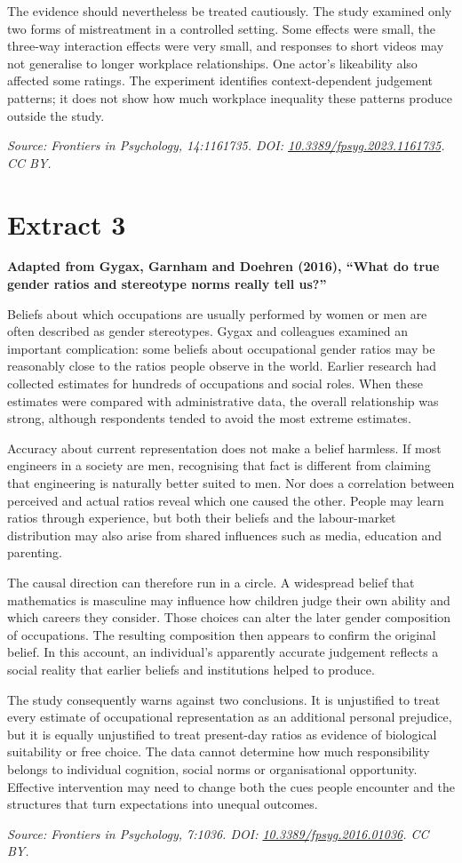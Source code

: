 \documentclass[11pt,a4paper]{article}
\newcommand{\sourceheading}[2]{%
  \section*{#1}
  \textbf{#2}\par\medskip
}
\begin{document}
The evidence should nevertheless be treated cautiously. The study examined only two forms of mistreatment in a controlled setting. Some effects were small, the three-way interaction effects were very small, and responses to short videos may not generalise to longer workplace relationships. One actor's likeability also affected some ratings. The experiment identifies context-dependent judgement patterns; it does not show how much workplace inequality these patterns produce outside the study.

\textit{Source: Frontiers in Psychology, 14:1161735. DOI: \href{https://doi.org/10.3389/fpsyg.2023.1161735}{10.3389/fpsyg.2023.1161735}. CC BY.}

\newpage

\sourceheading{Extract 3}{Adapted from Gygax, Garnham and Doehren (2016), ``What do true gender ratios and stereotype norms really tell us?''}

Beliefs about which occupations are usually performed by women or men are often described as gender stereotypes. Gygax and colleagues examined an important complication: some beliefs about occupational gender ratios may be reasonably close to the ratios people observe in the world. Earlier research had collected estimates for hundreds of occupations and social roles. When these estimates were compared with administrative data, the overall relationship was strong, although respondents tended to avoid the most extreme estimates.

Accuracy about current representation does not make a belief harmless. If most engineers in a society are men, recognising that fact is different from claiming that engineering is naturally better suited to men. Nor does a correlation between perceived and actual ratios reveal which one caused the other. People may learn ratios through experience, but both their beliefs and the labour-market distribution may also arise from shared influences such as media, education and parenting.

The causal direction can therefore run in a circle. A widespread belief that mathematics is masculine may influence how children judge their own ability and which careers they consider. Those choices can alter the later gender composition of occupations. The resulting composition then appears to confirm the original belief. In this account, an individual's apparently accurate judgement reflects a social reality that earlier beliefs and institutions helped to produce.

The study consequently warns against two conclusions. It is unjustified to treat every estimate of occupational representation as an additional personal prejudice, but it is equally unjustified to treat present-day ratios as evidence of biological suitability or free choice. The data cannot determine how much responsibility belongs to individual cognition, social norms or organisational opportunity. Effective intervention may need to change both the cues people encounter and the structures that turn expectations into unequal outcomes.

\textit{Source: Frontiers in Psychology, 7:1036. DOI: \href{https://doi.org/10.3389/fpsyg.2016.01036}{10.3389/fpsyg.2016.01036}. CC BY.}
\end{document}
